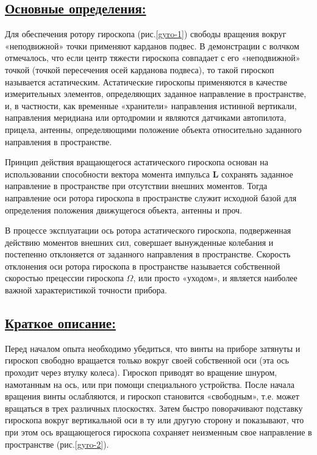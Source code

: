 \documentclass[14pt,a4paper,oneside]{extarticle}	%
\begin{document}
	\newpage	
		\subsection*{\underline{Основные определения:}}
		
		Для обеспечения ротору гироскопа (рис.\ref{gyro-1}) свободы вращения вокруг «неподвижной» точки применяют карданов подвес.
		В демонстрации с волчком отмечалось, что если центр тяжести гироскопа совпадает с его «неподвижной» точкой (точкой пересечения осей карданова подвеса), то такой гироскоп называется астатическим.
		Астатические гироскопы применяются в качестве измерительных элементов, определяющих заданное направление в пространстве, и, в частности, как временные «хранители» направления истинной вертикали, направления меридиана или ортодромии и являются датчиками автопилота, прицела, антенны, определяющими положение объекта относительно заданного направления в пространстве.
		
		Принцип действия вращающегося астатического гироскопа основан на использовании способности вектора момента импульса \textbf{L} сохранять заданное направление в пространстве при отсутствии внешних моментов.
		Тогда направление оси ротора гироскопа в пространстве служит исходной базой для определения положения движущегося объекта, антенны и проч.
		
		В процессе эксплуатации ось ротора астатического гироскопа, подверженная действию моментов внешних сил, совершает вынужденные колебания и постепенно отклоняется от заданного направления в пространстве.		
		Скорость отклонения оси ротора гироскопа в пространстве называется собственной скоростью прецессии гироскопа $ \Omega $, или просто «уходом», и является наиболее важной характеристикой точности прибора.

	\newpage
	\subsection*{\underline{Краткое описание:}}
	
	Перед началом опыта необходимо убедиться, что винты на приборе затянуты и гироскоп свободно вращается только вокруг своей собственной оси (эта ось проходит через втулку колеса).
	Гироскоп приводят во вращение шнуром, намотанным на ось, или при помощи специального устройства.
	После начала вращения винты ослабляются, и гироскоп становится «свободным», т.е. может вращаться в трех различных плоскостях.
	Затем быстро поворачивают подставку гироскопа вокруг вертикальной оси в ту или другую сторону и показывают, что при этом ось вращающегося гироскопа сохраняет неизменным свое направление в пространстве (рис.\ref{gyro-2}).
	
\end{document}
